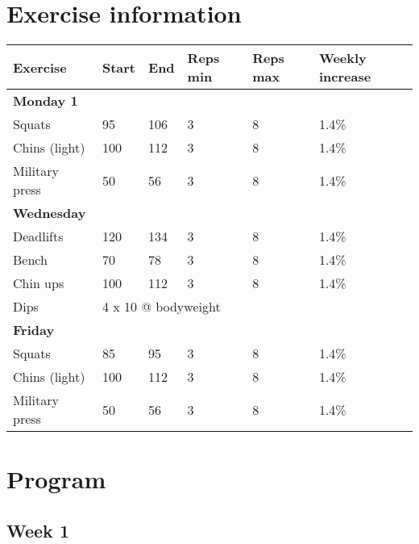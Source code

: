 \documentclass[12pt, a4paper]{article}%
\begin{document}
\section*{Exercise information}
\begin{tabular}{llllll}
    \textbf{Exercise} & \textbf{Start} & \textbf{End} & \textbf{Reps min}
    & \textbf{Reps max} & \textbf{Weekly increase} \\ \hline
      \textbf{ Monday 1 } & & & & & \\ \hline
        \hspace{0.5em}Squats & 95  &
         106  & 3 & 8 &
          1.4\%\\
        \hspace{0.5em}Chins (light) & 100  &
         112  & 3 & 8 &
          1.4\%\\
        \hspace{0.5em}Military press & 50  &
         56  & 3 & 8 &
          1.4\%\\
      \textbf{ Wednesday } & & & & & \\ \hline
        \hspace{0.5em}Deadlifts & 120  &
         134  & 3 & 8 &
          1.4\%\\
        \hspace{0.5em}Bench & 70  &
         78  & 3 & 8 &
          1.4\%\\
        \hspace{0.5em}Chin ups & 100  &
         112  & 3 & 8 &
          1.4\%\\
       \hspace{0.5em}Dips & \multicolumn{ 5 }{l}{ 4 x 10 @ bodyweight } \\
      \textbf{ Friday } & & & & & \\ \hline
        \hspace{0.5em}Squats & 85  &
         95  & 3 & 8 &
          1.4\%\\
        \hspace{0.5em}Chins (light) & 100  &
         112  & 3 & 8 &
          1.4\%\\
        \hspace{0.5em}Military press & 50  &
         56  & 3 & 8 &
          1.4\%\\
\end{tabular}


\clearpage
\section*{Program}
 \subsection*{\hspace{0.25em} Week 1 }
\end{document}
